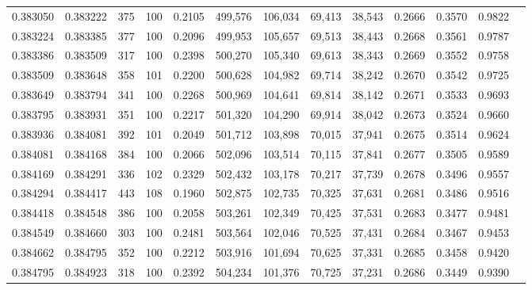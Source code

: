 \begin{tabular}{rrrrrrrrrrrrr}
0.383050 & 0.383222 &   375 & 100 &                                     0.2105 & 499,576 & 106,034 &  69,413 &  38,543 & 0.2666 & 0.3570 & 0.9822 \\
0.383224 & 0.383385 &   377 & 100 &                                     0.2096 & 499,953 & 105,657 &  69,513 &  38,443 & 0.2668 & 0.3561 & 0.9787 \\
0.383386 & 0.383509 &   317 & 100 &                                     0.2398 & 500,270 & 105,340 &  69,613 &  38,343 & 0.2669 & 0.3552 & 0.9758 \\
0.383509 & 0.383648 &   358 & 101 &                                     0.2200 & 500,628 & 104,982 &  69,714 &  38,242 & 0.2670 & 0.3542 & 0.9725 \\
0.383649 & 0.383794 &   341 & 100 &                                     0.2268 & 500,969 & 104,641 &  69,814 &  38,142 & 0.2671 & 0.3533 & 0.9693 \\
0.383795 & 0.383931 &   351 & 100 &                                     0.2217 & 501,320 & 104,290 &  69,914 &  38,042 & 0.2673 & 0.3524 & 0.9660 \\
0.383936 & 0.384081 &   392 & 101 &                                     0.2049 & 501,712 & 103,898 &  70,015 &  37,941 & 0.2675 & 0.3514 & 0.9624 \\
0.384081 & 0.384168 &   384 & 100 &                                     0.2066 & 502,096 & 103,514 &  70,115 &  37,841 & 0.2677 & 0.3505 & 0.9589 \\
0.384169 & 0.384291 &   336 & 102 &                                     0.2329 & 502,432 & 103,178 &  70,217 &  37,739 & 0.2678 & 0.3496 & 0.9557 \\
0.384294 & 0.384417 &   443 & 108 &                                     0.1960 & 502,875 & 102,735 &  70,325 &  37,631 & 0.2681 & 0.3486 & 0.9516 \\
0.384418 & 0.384548 &   386 & 100 &                                     0.2058 & 503,261 & 102,349 &  70,425 &  37,531 & 0.2683 & 0.3477 & 0.9481 \\
0.384549 & 0.384660 &   303 & 100 &                                     0.2481 & 503,564 & 102,046 &  70,525 &  37,431 & 0.2684 & 0.3467 & 0.9453 \\
0.384662 & 0.384795 &   352 & 100 &                                     0.2212 & 503,916 & 101,694 &  70,625 &  37,331 & 0.2685 & 0.3458 & 0.9420 \\
0.384795 & 0.384923 &   318 & 100 &                                     0.2392 & 504,234 & 101,376 &  70,725 &  37,231 & 0.2686 & 0.3449 & 0.9390 \\

\end{tabular}
